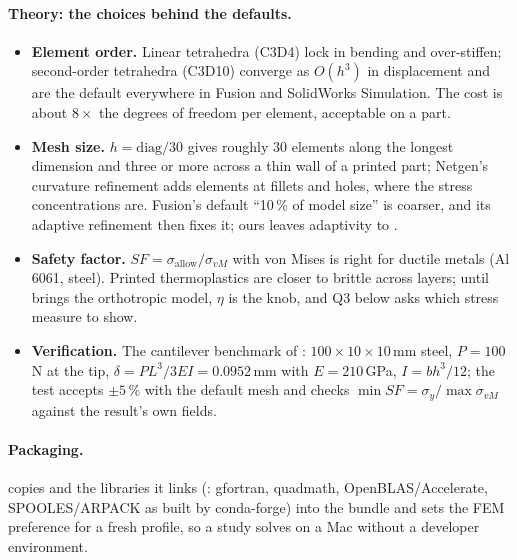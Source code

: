 \paragraph{Theory: the choices behind the defaults.}
\begin{itemize}
  \item \textbf{Element order.} Linear tetrahedra (C3D4) lock in bending and over-stiffen; second-order
        tetrahedra (C3D10) converge as $O(h^3)$ in displacement and are the default everywhere in Fusion and
        SolidWorks Simulation. The cost is about $8\times$ the degrees of freedom per element, acceptable on a part.
  \item \textbf{Mesh size.} $h=\text{diag}/30$ gives roughly $30$ elements along the longest dimension and three
        or more across a thin wall of a printed part; Netgen's curvature refinement adds elements at fillets and
        holes, where the stress concentrations are. Fusion's default ``10\,\% of model size'' is coarser, and its
        adaptive refinement then fixes it; ours leaves adaptivity to .
  \item \textbf{Safety factor.} $SF=\sigma_{\text{allow}}/\sigma_{vM}$ with von Mises is right for ductile
        metals (Al 6061, steel). Printed thermoplastics are closer to brittle across layers; until 
        brings the orthotropic model, $\eta$ is the knob, and Q3 below asks which stress measure to show.
  \item \textbf{Verification.} The cantilever benchmark of : $100\times10\times10$\,mm steel,
        $P=100$\,N at the tip, $\delta=PL^3/3EI=0.0952$\,mm with $E=210$\,GPa, $I=bh^3/12$; the test accepts
        $\pm5$\,\% with the default mesh and checks $\min SF=\sigma_y/\max\sigma_{vM}$ against the result's own
        fields.
\end{itemize}

\paragraph{Packaging.}  copies  and the libraries it links
(: gfortran, quadmath, OpenBLAS/Accelerate, SPOOLES/ARPACK as built by conda-forge) into the
bundle and sets the FEM preference  for a fresh profile, so a study solves on a
Mac without a developer environment.

